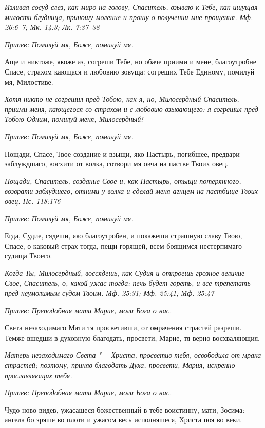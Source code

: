 \itshape Изливая сосуд слез, как миро на голову, Спаситель, взываю к Тебе, как ищущая милости блудница, приношу моление и прошу о получении мне прощения. Мф. 26:6–7; Мк. 14:3; Лк. 7:37–38\normalfont{}


\itshape Припев:\normalfont{} Помилуй мя, Боже, помилуй мя.


Аще и никтоже, якоже аз, согреши Тебе, но обаче приими и мене, благоутробне Спасе, страхом кающася и любовию зовуща: согреших Тебе Единому, помилуй мя, Милостиве.


\itshape Хотя никто не согрешил пред Тобою, как я, но, Милосердный Спаситель, приими меня, кающегося со страхом и с любовию взывающего: я согрешил пред Тобою Одним, помилуй меня, Милосердный!\normalfont{}


\itshape Припев:\normalfont{} Помилуй мя, Боже, помилуй мя.


Пощади, Спасе, Твое создание и взыщи, яко Пастырь, погибшее, предвари заблуждшаго, восхити от волка, сотвори мя овча на пастве Твоих овец.


\itshape Пощади, Спаситель, создание Свое и, как Пастырь, отыщи потерянного, возврати заблудшего, отними у волка и сделай меня агнцем на пастбище Твоих овец. Пс. 118:176\normalfont{}


\itshape Припев:\normalfont{} Помилуй мя, Боже, помилуй мя.


Егда, Судие, сядеши, яко благоутробен, и покажеши страшную славу Твою, Спасе, о каковый страх тогда, пещи горящей, всем боящимся нестерпимаго судища Твоего.


\itshape Когда Ты, Милосердный, воссядешь, как Судия и откроешь грозное величие Свое, Спаситель, о, какой ужас тогда: печь будет гореть, и все трепетать пред неумолимым судом Твоим. Мф. 25:31; Мф. 25:41; Мф. 25:47\normalfont{}


\itshape Припев:\normalfont{} Преподобная мати Марие, моли Бога о нас.


Света незаходимаго Мати тя просветивши, от омрачения страстей разреши. Темже вшедши в духовную благодать, просвети, Марие, тя верно восхваляющия.


\itshape Матерь незаходимаго Света "--- Христа, просветив тебя, освободила от мрака страстей; поэтому, приняв благодать Духа, просвети, Мария, искренно прославляющих тебя.\normalfont{}


\itshape Припев:\normalfont{} Преподобная мати Марие, моли Бога о нас.


Чудо ново видев, ужасашеся божественный в тебе воистинну, мати, Зосима: ангела бо зряше во плоти и ужасом весь исполняшеся, Христа поя во веки.


